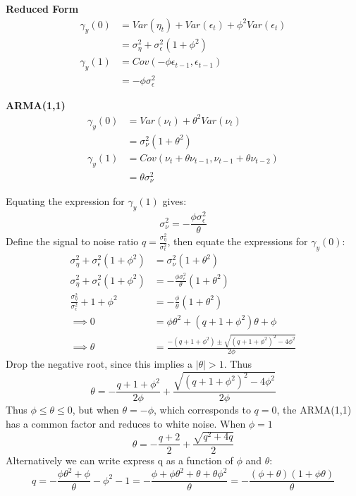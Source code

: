 \documentclass[DIV=14,titlepage=false]{scrreprt}
\begin{document}
\begin{minipage}[c]{0.45\textwidth}
    \textbf{Reduced Form}
    \begin{align*}
        \gamma_y(0) &= Var(\eta_t)+Var(\epsilon_t)+\phi^2Var(\epsilon_t)\\
        &=\sigma^2_\eta + \sigma^2_\epsilon (1 + \phi^2)\\
        \gamma_y(1) &= Cov(- \phi \epsilon_{t-1}, \epsilon_{t-1})\\
        &= -\phi \sigma^2_\epsilon
    \end{align*}
\end{minipage}\hfill
\begin{minipage}[c]{0.45\textwidth}
    \textbf{ARMA(1,1)}
    \begin{align*}
        \gamma_y(0) &= Var(\nu_t)+\theta^2Var(\nu_t) \\
        &= \sigma^2_\nu (1+\theta^2) \\
        \gamma_y(1) &= Cov(\nu_t + \theta \nu_{t-1}, \nu_{t-1} + \theta \nu_{t-2})\\
        &=\theta\sigma^2_\nu
    \end{align*}
\end{minipage}

Equating the expression for $\gamma_y(1)$ gives:
\[
    \sigma^2_\nu = -\frac{\phi \sigma^2_\epsilon}{\theta}
\]
Define the signal to noise ratio $q = \frac{\sigma^2_\eta}{\sigma^2_\epsilon}$, then equate the expressions for $\gamma_y(0)$:
\begin{align*}
    \sigma^2_\eta + \sigma^2_\epsilon (1 + \phi^2) &= \sigma^2_\nu (1+\theta^2)\\
    \sigma^2_\eta + \sigma^2_\epsilon (1 + \phi^2) &= -\frac{\phi \sigma^2_\epsilon}{\theta} (1+\theta^2)\\
    \frac{\sigma^2_\eta}{\sigma^2_\epsilon} + 1 + \phi^2 &= -\frac{\phi}{\theta} (1+\theta^2)\\
    \implies 0 &= \phi \theta^2 + (q +1 + \phi^2)\theta + \phi\\
    \implies \theta &= \frac{-(q+1+\phi^2) \pm \sqrt{(q+1+\phi^2)^2 - 4\phi^2}}{2\phi}
\end{align*}
Drop the negative root, since this implies a $|\theta|>1$.
Thus 
\[
    \theta = -\frac{q+1+\phi^2}{2\phi} + \frac{\sqrt{(q+1+\phi^2)^2 - 4\phi^2}}{2\phi}
\]
Thus $\phi \leq \theta \leq 0$, but when $\theta = -\phi$, which corresponds to $q=0$, the ARMA(1,1) has a common factor and reduces to white noise. When $\phi = 1$
\[
    \theta = -\frac{q+2}{2} + \frac{\sqrt{q^2+4q}}{2}
\]
Alternatively we can write express q as a function of $\phi$ and $\theta$:
\[
    q = -\frac{\phi \theta^2 + \phi}{\theta} - \phi^2 - 1 = -\frac{\phi + \phi \theta^2 + \theta + \theta \phi^2}{\theta} = -\frac{(\phi + \theta)(1+\phi \theta)}{\theta}
\]
\end{document}
